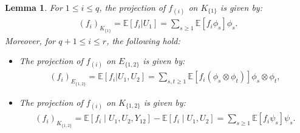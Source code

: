 \documentclass[11pt,reqno]{amsart}
\numberwithin{equation}{section}
\newtheorem{lemma}{Lemma}[section]
\theoremstyle{definition}
\begin{document}
\begin{lemma}\label{lm:fHiprojection} For $1 \leq i \leq q$, the projection of $f_{(i)}$ on $K_{\{1\}}$ is given by: 
\begin{align}\label{eq:f-decompK1}
    (f_{i})_{K_{\{1\}}} = \mathbb E[f_i|U_1] = \sum_{s \geq 1}\mathbb{E}\left[f_{i} \phi_{s}\right]\phi_{s} . 
\end{align}
Moreover, for  $q+1 \leq i \leq r$, the following hold: 
\begin{itemize}
\item The projection of $f_{(i)}$ on $E_{\{1,2\}}$ is given by: 
\begin{align}\label{eq:f-decompE12}
    (f_{i})_{E_{\{1,2\}}} = \mathbb E[f_i|U_1, U_2] = \sum_{s, t \geq 1}\mathbb{E}\left[f_{i} (\phi_{s}\otimes\phi_{t}) \right]\phi_{s}\otimes\phi_{t}, 
    \end{align} 

\item The projection of $f_{(i)}$ on $K_{\{1,2\}}$ is given by: 
    \begin{align}\label{eq:f-decompK12}
    (f_{i})_{K_{\{1,2\}}} =  \mathbb{E}\left[f_{i}\middle| U_{1},U_{2},Y_{12}\right] - \mathbb{E}\left[f_{i}\middle| U_{1},U_{2}\right] = \sum_{s \geq 1}\mathbb{E}\left[f_{i}\psi_{s}\right]\psi_{s} . 
    \end{align} 
\end{itemize}
\end{lemma}
\end{document}

